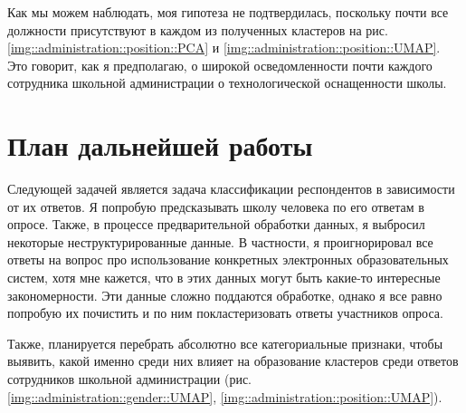 Как мы можем наблюдать, моя гипотеза не подтвердилась, поскольку почти все должности присутствуют в каждом из полученных кластеров на рис. \ref{img::administration::position::PCA} и \ref{img::administration::position::UMAP}.
Это говорит, как я предполагаю, о широкой осведомленности почти каждого сотрудника школьной администрации о технологической оснащенности школы.

\newpage
\section{План дальнейшей работы}

Следующей задачей является задача классификации респондентов в зависимости от их ответов.
Я попробую предсказывать школу человека по его ответам в опросе.
Также, в процессе предварительной обработки данных, я выбросил некоторые неструктурированные данные.
В частности, я проигнорировал все ответы на вопрос про использование конкретных электронных образовательных систем, хотя мне кажется, что в этих данных могут быть какие-то интересные закономерности.
Эти данные сложно поддаются обработке, однако я все равно попробую их почистить и по ним покластеризовать ответы участников опроса.

Также, планируется перебрать абсолютно все категориальные признаки, чтобы выявить, какой именно среди них влияет на образование кластеров среди ответов сотрудников школьной администрации (рис. \ref{img::administration::gender::UMAP}, \ref{img::administration::position::UMAP}).